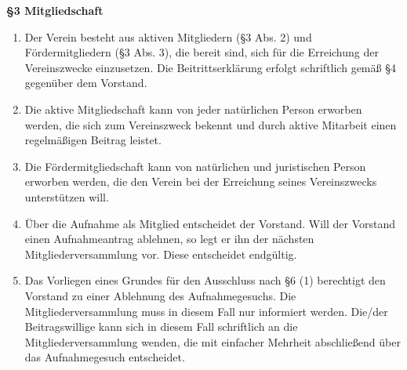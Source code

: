 \documentclass[a4paper,
               12pt,
               titlepage,
               parskip=half]{scrartcl}
\begin{document}
\textbf{§3 Mitgliedschaft}
{\small
\begin{enumerate}
	\item Der Verein besteht aus aktiven Mitgliedern (§3 Abs. 2) und Fördermitgliedern (§3 Abs. 3), die bereit sind, sich für die Erreichung der Vereinszwecke einzusetzen. Die Beitrittserklärung erfolgt schriftlich gemäß §4 gegenüber dem Vorstand.
	\item Die aktive Mitgliedschaft kann von jeder natürlichen Person erworben werden, die sich zum Vereinszweck bekennt und durch aktive Mitarbeit einen regelmäßigen Beitrag leistet.
	\item Die Fördermitgliedschaft kann von natürlichen und juristischen Person erworben werden, die den Verein bei der Erreichung seines Vereinszwecks unterstützen will.
	\item Über die Aufnahme als Mitglied entscheidet der Vorstand. Will der Vorstand einen Aufnahmeantrag ablehnen, so legt er ihn der nächsten Mitgliederversammlung vor. Diese entscheidet endgültig.
	\item Das Vorliegen eines Grundes für den Ausschluss nach §6 (1) berechtigt den Vorstand zu einer Ablehnung des Aufnahmegesuchs. Die Mitgliederversammlung muss in diesem Fall nur informiert werden. Die/der Beitragswillige kann sich in diesem Fall schriftlich an die Mitgliederversammlung wenden, die mit einfacher Mehrheit abschließend über das Aufnahmegesuch entscheidet.
\end{enumerate}
}

\vspace{1.0em}
\end{document}
